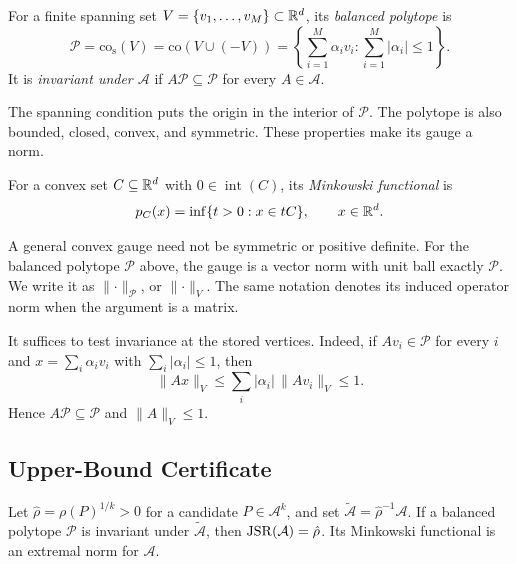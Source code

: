 \begin{definition}
    \label{def:balancedPolytope}
    For a finite spanning set $V=\{v_1,\dots,v_M\}\subset\mathbb{R}^d$, its \emph{balanced polytope} is
    \[
        \mathcal{P}=\mathrm{co}_{\mathrm{s}}(V)=\mathrm{co}(V\cup(-V))
        =\left\{\sum_{i=1}^M\alpha_iv_i:\sum_{i=1}^M|\alpha_i|\leq1\right\}.
    \]
    It is \emph{invariant under $\mathcal{A}$} if $A\mathcal{P}\subseteq\mathcal{P}$ for every $A\in\mathcal{A}$.
\end{definition}

The spanning condition puts the origin in the interior of $\mathcal{P}$.
The polytope is also bounded, closed, convex, and symmetric.
These properties make its gauge a norm.

\begin{definition}\citep{MagarilIlyaevTikhomirov2001ConvexAnalysis}
    \label{def:minkowskiFunctional}
    For a convex set $C\subseteq\mathbb{R}^d$ with $0\in\operatorname{int}(C)$, its \emph{Minkowski functional} is
    \[
        p_C(x)=\inf\{t>0:x\in tC\},\qquad x\in\mathbb{R}^d.
    \]
\end{definition}

\begin{remark}
    \label{rem:balancedPolytopeInducedNorm}
    A general convex gauge need not be symmetric or positive definite.
    For the balanced polytope $\mathcal{P}$ above, the gauge is a vector norm with unit ball exactly $\mathcal{P}$.
    We write it as $\lVert\cdot\rVert_{\mathcal{P}}$, or $\lVert\cdot\rVert_V$.
    The same notation denotes its induced operator norm when the argument is a matrix.
\end{remark}

It suffices to test invariance at the stored vertices.
Indeed, if $Av_i\in\mathcal{P}$ for every $i$ and $x=\sum_i\alpha_iv_i$ with $\sum_i|\alpha_i|\leq1$, then
\[
    \lVert Ax\rVert_V
    \leq\sum_i|\alpha_i|\,\lVert Av_i\rVert_V\leq1.
\]
Hence $A\mathcal{P}\subseteq\mathcal{P}$ and $\lVert A\rVert_V\leq1$.

\subsection{Upper-Bound Certificate}

\begin{theorem}\citep{GuglielmiProtasov2013ExactComputationJSR}
    \label{thm:invariantPolytopeImpliesJsrUpperBound}
    Let $\hat\rho=\rho(P)^{1/k}>0$ for a candidate $P\in\mathcal{A}^k$, and set $\tilde{\mathcal{A}}=\hat\rho^{-1}\mathcal{A}$.
    If a balanced polytope $\mathcal{P}$ is invariant under $\tilde{\mathcal{A}}$, then $\operatorname{JSR}(\mathcal{A})=\hat\rho$.
    Its Minkowski functional is an extremal norm for $\mathcal{A}$.
\end{theorem}

